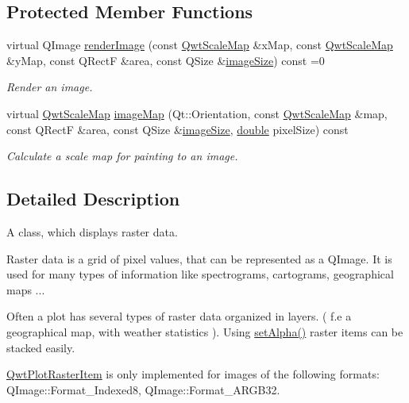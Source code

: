 \subsection*{Protected Member Functions}
\begin{DoxyCompactItemize}
\item 
virtual Q\-Image \hyperlink{class_qwt_plot_raster_item_a1738b36c0e6e4073f3ad6629e7923f74}{render\-Image} (const \hyperlink{class_qwt_scale_map}{Qwt\-Scale\-Map} \&x\-Map, const \hyperlink{class_qwt_scale_map}{Qwt\-Scale\-Map} \&y\-Map, const Q\-Rect\-F \&area, const Q\-Size \&\hyperlink{glext_8h_aec2b86da467cc9c4b739b07069de8cfb}{image\-Size}) const =0
\begin{DoxyCompactList}\small\item\em Render an image. \end{DoxyCompactList}\item 
virtual \hyperlink{class_qwt_scale_map}{Qwt\-Scale\-Map} \hyperlink{class_qwt_plot_raster_item_a9feb834f9e40cdff11d8cd6ad74fda10}{image\-Map} (Qt\-::\-Orientation, const \hyperlink{class_qwt_scale_map}{Qwt\-Scale\-Map} \&map, const Q\-Rect\-F \&area, const Q\-Size \&\hyperlink{glext_8h_aec2b86da467cc9c4b739b07069de8cfb}{image\-Size}, \hyperlink{_super_l_u_support_8h_a8956b2b9f49bf918deed98379d159ca7}{double} pixel\-Size) const 
\begin{DoxyCompactList}\small\item\em Calculate a scale map for painting to an image. \end{DoxyCompactList}\end{DoxyCompactItemize}


\subsection{Detailed Description}
A class, which displays raster data. 

Raster data is a grid of pixel values, that can be represented as a Q\-Image. It is used for many types of information like spectrograms, cartograms, geographical maps ...

Often a plot has several types of raster data organized in layers. ( f.\-e a geographical map, with weather statistics ). Using \hyperlink{class_qwt_plot_raster_item_a14f2ab8ec0994384e6269f869c352273}{set\-Alpha()} raster items can be stacked easily.

\hyperlink{class_qwt_plot_raster_item}{Qwt\-Plot\-Raster\-Item} is only implemented for images of the following formats\-: Q\-Image\-::\-Format\-\_\-\-Indexed8, Q\-Image\-::\-Format\-\_\-\-A\-R\-G\-B32.

